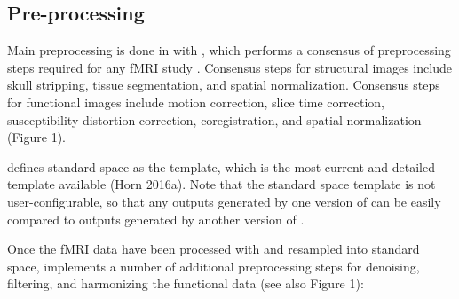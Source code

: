 \subsection{Pre-processing}\label{sec:pre_processing}

Main preprocessing is done in  with , which performs a consensus of preprocessing steps required for any fMRI study \parencite{esteban2019a}. Consensus steps for structural images include skull stripping, tissue segmentation, and spatial normalization. Consensus steps for functional images include motion correction, slice time correction, susceptibility distortion correction, coregistration, and spatial normalization (Figure 1).

 defines standard space as the  template, which is the most current and detailed template available (Horn 2016a). Note that the standard space template is not user-configurable, so that any outputs generated by one version of  can be easily compared to outputs generated by another version of .

Once the fMRI data have been processed with  and resampled into standard space,  implements a number of additional preprocessing steps for denoising, filtering, and harmonizing the functional data (see also Figure 1):

